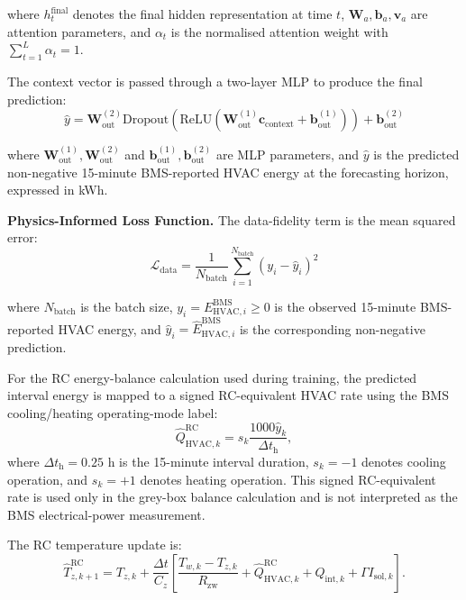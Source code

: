 \documentclass[11pt]{article}
\begin{document}
where $h_t^{\text{final}}$ denotes the final hidden representation at time $t$, $\mathbf{W}_a,\mathbf{b}_a,\mathbf{v}_a$ are attention parameters, and $\alpha_t$ is the normalised attention weight with $\sum_{t=1}^{L}\alpha_t=1$.

The context vector is passed through a two-layer MLP to produce the final prediction:
\begin{equation}
\hat{y} = \mathbf{W}_{\text{out}}^{(2)} \text{Dropout}\left(\text{ReLU}(\mathbf{W}_{\text{out}}^{(1)} \mathbf{c}_{\text{context}} + \mathbf{b}_{\text{out}}^{(1)})\right) + \mathbf{b}_{\text{out}}^{(2)}
\end{equation}

where $\mathbf{W}_{\text{out}}^{(1)},\mathbf{W}_{\text{out}}^{(2)}$ and $\mathbf{b}_{\text{out}}^{(1)},\mathbf{b}_{\text{out}}^{(2)}$ are MLP parameters, and $\hat{y}$ is the predicted non-negative 15-minute BMS-reported HVAC energy at the forecasting horizon, expressed in kWh.

\medskip
\par\noindent\hspace*{2em}\textbf{Physics-Informed Loss Function.} The data-fidelity term is the mean squared error:
\begin{equation}
\mathcal{L}_{\text{data}} = \frac{1}{N_{\text{batch}}} \sum_{i=1}^{N_{\text{batch}}} (y_i - \hat{y}_i)^2
\end{equation}

where $N_{\mathrm{batch}}$ is the batch size, $y_i=E_{\mathrm{HVAC},i}^{\mathrm{BMS}}\geq0$ is the observed 15-minute BMS-reported HVAC energy, and $\hat{y}_i=\hat{E}_{\mathrm{HVAC},i}^{\mathrm{BMS}}$ is the corresponding non-negative prediction.

For the RC energy-balance calculation used during training, the predicted interval energy is mapped to a signed RC-equivalent HVAC rate using the BMS cooling/heating operating-mode label:
\begin{equation}
\hat{Q}_{\mathrm{HVAC},k}^{\mathrm{RC}}
=
s_k\frac{1000\hat{y}_k}{\Delta t_{\mathrm{h}}},
\end{equation}
where $\Delta t_{\mathrm{h}}=0.25$ h is the 15-minute interval duration, $s_k=-1$ denotes cooling operation, and $s_k=+1$ denotes heating operation. This signed RC-equivalent rate is used only in the grey-box balance calculation and is not interpreted as the BMS electrical-power measurement.

The RC temperature update is:
\begin{equation}
\hat{T}_{z,k+1}^{\mathrm{RC}}
=
T_{z,k}
+
\frac{\Delta t}{C_z}
\left[
\frac{T_{w,k}-T_{z,k}}{R_{\mathrm{zw}}}
+
\hat{Q}_{\mathrm{HVAC},k}^{\mathrm{RC}}
+
Q_{\mathrm{int},k}
+
\Gamma I_{\mathrm{sol},k}
\right].
\end{equation}
\end{document}
